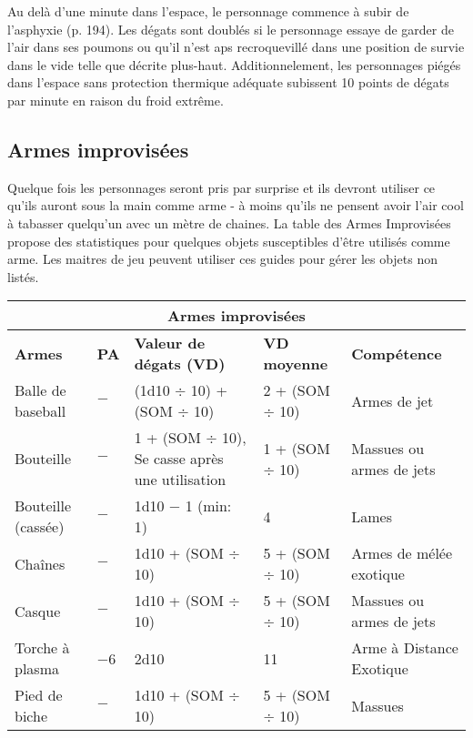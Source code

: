 Au delà d'une minute dans l'espace, le personnage commence à subir de l'asphyxie (p. 194). Les dégats sont doublés si le personnage essaye de garder de l'air dans ses poumons ou qu'il n'est aps recroquevillé dans une position de survie dans le vide telle que décrite plus-haut. Additionnelement, les personnages piégés dans l'espace sans protection thermique adéquate subissent 10 points de dégats par minute en raison du froid extrême. 

\subsection{Armes improvisées} \label{sec:improvised-weapons} 

Quelque fois les personnages seront pris par surprise et ils devront utiliser ce qu'ils auront sous la main comme arme - à moins qu'ils ne pensent avoir l'air cool à tabasser quelqu'un avec un mètre de chaines. La table des Armes Improvisées propose des statistiques pour quelques objets susceptibles d'être utilisés comme arme. Les maitres de jeu peuvent utiliser ces guides pour gérer les objets non listés. 

\begin{table} \begin{tabularx}{\textwidth}{|l|l|l|l|X|} \hline

\multicolumn{5}{|c|}{\textbf{Armes improvisées}} \\ \hline

\textbf{Armes}	&\textbf{PA}	&\textbf{Valeur de dégats (VD)}	&\textbf{VD moyenne}	&\textbf{Compétence}	\\ \hline

Balle de baseball	&$-$	&(1d10 $\div$ 10) + (SOM $\div$ 10)	&2 + (SOM $\div$ 10)	&Armes de jet	\\ \hline

Bouteille	&$-$	&1 + (SOM $\div$ 10), Se casse après une utilisation	&1 + (SOM $\div$ 10)	&Massues ou armes de jets	\\ \hline

Bouteille (cassée)	&$-$	&1d10 $-$ 1 (min: 1)	&4	&Lames	\\ \hline

Chaînes	&$-$	&1d10 + (SOM $\div$ 10)	&5 + (SOM $\div$ 10)	&Armes de mélée exotique\\ \hline

Casque	&$-$	&1d10 + (SOM $\div$ 10)	&5 + (SOM $\div$ 10)	&Massues ou armes de jets	\\ \hline

Torche à plasma	&$-$6	&2d10	&11	&Arme à Distance Exotique \\ \hline

Pied de biche	&$-$ &1d10 + (SOM $\div$ 10)	&5 + (SOM $\div$ 10)	&Massues	\\ \hline

\end{tabularx} \label{tab:improvised-weapons} \end{table} 


